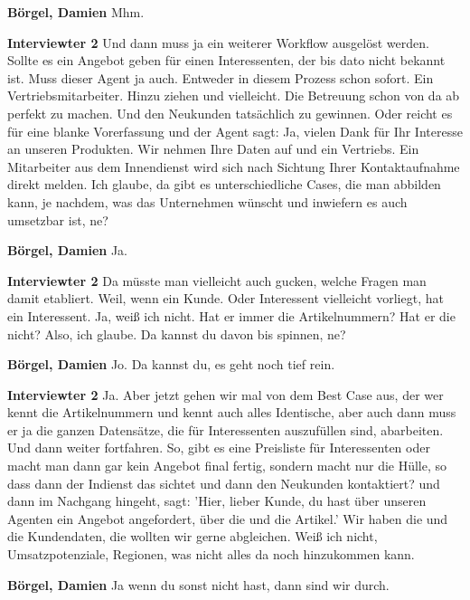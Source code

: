 \textbf{Börgel, Damien}\newline
Mhm.

\textbf{Interviewter 2}\newline
Und dann muss ja ein weiterer Workflow ausgelöst werden. Sollte es ein Angebot geben für einen Interessenten, der bis dato nicht bekannt ist.
Muss dieser Agent ja auch. Entweder in diesem Prozess schon sofort.
Ein Vertriebsmitarbeiter. Hinzu ziehen und vielleicht.
Die Betreuung schon von da ab perfekt zu machen.
Und den Neukunden tatsächlich zu gewinnen. Oder reicht es für eine blanke Vorerfassung und der Agent sagt: Ja, vielen Dank für Ihr Interesse an unseren Produkten. Wir nehmen Ihre Daten auf und ein Vertriebs.
Ein Mitarbeiter aus dem Innendienst wird sich nach Sichtung Ihrer Kontaktaufnahme direkt melden. Ich glaube, da gibt es unterschiedliche Cases, die man abbilden kann, je nachdem, was das Unternehmen wünscht und inwiefern es auch umsetzbar ist, ne?

\textbf{Börgel, Damien}\newline
Ja.

\textbf{Interviewter 2}\newline
Da müsste man vielleicht auch gucken, welche Fragen man damit etabliert.
Weil, wenn ein Kunde.
Oder Interessent vielleicht vorliegt, hat ein Interessent.
Ja, weiß ich nicht. Hat er immer die Artikelnummern? Hat er die nicht? Also, ich glaube. Da kannst du davon bis spinnen, ne?

\textbf{Börgel, Damien}\newline
Jo.
Da kannst du, es geht noch tief rein.

\textbf{Interviewter 2}\newline
Ja.
Aber jetzt gehen wir mal von dem Best Case aus, der wer kennt die Artikelnummern und kennt auch alles Identische, aber auch dann muss er ja die ganzen Datensätze, die für Interessenten auszufüllen sind, abarbeiten.
Und dann weiter fortfahren. 
So, gibt es eine Preisliste für Interessenten oder macht man dann gar kein Angebot final fertig, sondern macht nur die Hülle, so dass dann der Indienst das sichtet und dann den Neukunden kontaktiert?
und dann im Nachgang hingeht, sagt: 'Hier, lieber Kunde, du hast über unseren Agenten ein Angebot angefordert, über die und die Artikel.'
Wir haben die und die Kundendaten, die wollten wir gerne abgleichen.
Weiß ich nicht, Umsatzpotenziale, Regionen, was nicht alles da noch hinzukommen kann.

\textbf{Börgel, Damien}\newline
Ja wenn du sonst nicht hast, dann sind wir durch.

